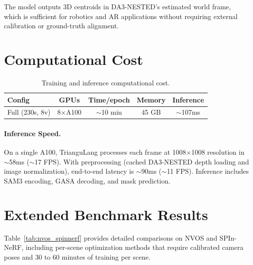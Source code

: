 The model outputs 3D centroids in DA3-NESTED's estimated world frame, which is sufficient for robotics and AR applications without requiring external calibration or ground-truth alignment.

\section{Computational Cost}
\label{app:compute}

\begin{table}[h]
\centering
\caption{Training and inference computational cost.}
\label{tab:compute}
\small
\begin{tabular}{@{}lcccc@{}}
\toprule
\textbf{Config} & \textbf{GPUs} & \textbf{Time/epoch} & \textbf{Memory} & \textbf{Inference} \\
\midrule
Full (230s, 8v) & 8$\times$A100 & $\sim$10 min & 45 GB & $\sim$107ms \\
\bottomrule
\end{tabular}
\end{table}

\paragraph{Inference Speed.}
On a single A100, TrianguLang processes each frame at 1008$\times$1008 resolution in $\sim$58ms ($\sim$17 FPS). With preprocessing (cached DA3-NESTED depth loading and image normalization), end-to-end latency is $\sim$90ms ($\sim$11 FPS). Inference includes SAM3 encoding, GASA decoding, and mask prediction.

\section{Extended Benchmark Results}
\label{app:benchmarks}

Table~\ref{tab:nvos_spinnerf} provides detailed comparisons on NVOS and SPIn-NeRF, including per-scene optimization methods that require calibrated camera poses and 30 to 60 minutes of training per scene.

